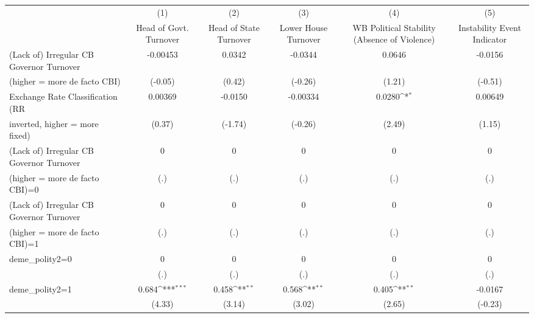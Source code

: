 {
\def\sym#1{\ifmmode^{#1}\else\(^{#1}\)\fi}
\begin{tabular}{l*{5}{c}}
\toprule
                                        &\multicolumn{1}{c}{(1)}&\multicolumn{1}{c}{(2)}&\multicolumn{1}{c}{(3)}&\multicolumn{1}{c}{(4)}&\multicolumn{1}{c}{(5)}\\
                                        &\multicolumn{1}{c}{Head of Govt. Turnover}&\multicolumn{1}{c}{Head of State Turnover}&\multicolumn{1}{c}{Lower House Turnover}&\multicolumn{1}{c}{WB Political Stability (Absence of Violence)}&\multicolumn{1}{c}{Instability Event Indicator}\\
\midrule
(Lack of) Irregular CB Governor Turnover&-0.00453         &0.0342         &-0.0344         &0.0646         &-0.0156         \\
(higher = more de facto CBI)            &(-0.05)         &(0.42)         &(-0.26)         &(1.21)         &(-0.51)         \\
\addlinespace
Exchange Rate Classification (RR        &0.00369         &-0.0150         &-0.00334         &0.0280\sym{*}  &0.00649         \\
inverted, higher = more fixed)          &(0.37)         &(-1.74)         &(-0.26)         &(2.49)         &(1.15)         \\
\addlinespace
(Lack of) Irregular CB Governor Turnover&    0         &    0         &    0         &    0         &    0         \\
(higher = more de facto CBI)=0          &  (.)         &  (.)         &  (.)         &  (.)         &  (.)         \\
\addlinespace
(Lack of) Irregular CB Governor Turnover&    0         &    0         &    0         &    0         &    0         \\
(higher = more de facto CBI)=1          &  (.)         &  (.)         &  (.)         &  (.)         &  (.)         \\
\addlinespace
deme\_polity2=0                          &    0         &    0         &    0         &    0         &    0         \\
                                        &  (.)         &  (.)         &  (.)         &  (.)         &  (.)         \\
\addlinespace
deme\_polity2=1                          &0.684\sym{***}&0.458\sym{**} &0.568\sym{**} &0.405\sym{**} &-0.0167         \\
                                        &(4.33)         &(3.14)         &(3.02)         &(2.65)         &(-0.23)         \\

\end{tabular}}
